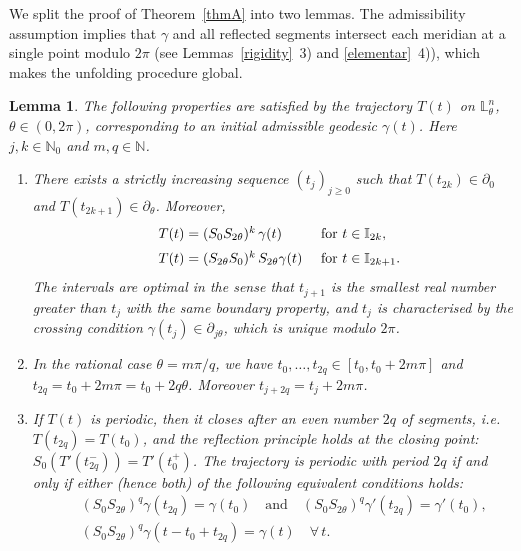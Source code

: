 \documentclass[11pt,a4paper,times]{amsart}
\theoremstyle{plain}
\newtheorem{lemma}[thm]{Lemma}
\theoremstyle{definition}
\numberwithin{equation}{section}
\newcommand{\eqskip}{ \vspace*{2mm}\\ }
\newcommand{\N}{\mathbb{N}}
\newcommand{\lune}[2]{\mathbb{L}^{#1}_{#2}}
\begin{document}
We split the proof of Theorem~\ref{thmA} into two lemmas. The admissibility assumption implies that
$\gamma$ and all reflected segments intersect each meridian at a single point modulo $2\pi$
(see Lemmas~\ref{rigidity}~3) and \ref{elementar}~4)), which makes the unfolding procedure global.

%
\begin{lemma}\label{thmAA}
The following properties are satisfied by the trajectory $T(t)$ on $\lune{n}{\theta}$, $\theta\in(0,2\pi)$,
corresponding to an initial admissible geodesic $\gamma(t)$. Here $j,k\in\N_0$ and $m,q\in\N$.
\begin{enumerate}[{\rm 1)}]
\item There exists a strictly increasing sequence $(t_j)_{j\ge0}$ such that $T(t_{2k})\in\partial_0$ and
$T(t_{2k+1})\in\partial_\theta$. Moreover,
\begin{equation}\label{gamma2k}
\begin{array}{lll}
&T(t)=(S_0S_{2\theta})^k\,\gamma(t)& \mbox{ for } t\in \mathbb{I}_{2k},\eqskip
&T(t)=(S_{2\theta}S_0)^k\,S_{2\theta}\gamma(t) & \mbox{ for } t\in \mathbb{I}_{2k+1}.
\end{array}
\end{equation}
The intervals are optimal in the sense that $t_{j+1}$ is the smallest real number greater than $t_j$
with the same boundary property, and $t_j$ is characterised by the crossing condition
$\gamma(t_j)\in\partial_{j\theta}$, which is unique modulo $2\pi$.\\[-3mm]

\item In the rational case $\theta=m\pi/q$, we have
$t_0,\ldots,t_{2q}\in [t_0,t_0+2m\pi]$ and $t_{2q}=t_0+2m\pi=t_0+2q\theta$.
Moreover $t_{j+2q}=t_j+2m\pi$.\\[-3mm]

\item If $T(t)$ is periodic, then it closes after an even number $2q$ of segments, i.e.\
$T(t_{2q})=T(t_0)$, and the reflection principle holds at the closing point:
$S_0(T'(t_{2q}^-))=T'(t_0^+)$. The trajectory is periodic with period $2q$ if and only if
either (hence both) of the following equivalent conditions holds:
\begin{eqnarray}\label{closure1}
&&(S_0S_{2\theta})^q\gamma(t_{2q})=\gamma(t_0)\quad \mbox{and}\quad
(S_0S_{2\theta})^q\gamma'(t_{2q})=\gamma'(t_0),\\
\label{closure2}
&&(S_0S_{2\theta})^q\gamma(t-t_0+t_{2q})=\gamma(t)\quad\forall\,t.
\end{eqnarray}
\end{enumerate}
\end{lemma}
\end{document}
